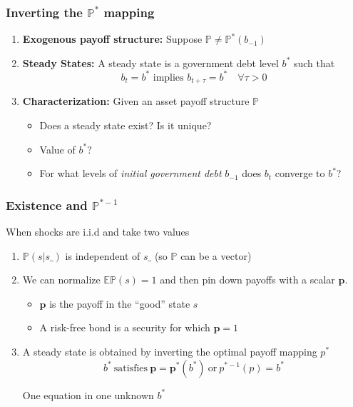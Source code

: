 \documentclass{beamer}
\begin{document}
%
\begin{frame}
	\frametitle{Inverting the $\mathbb{P}^*$ mapping}
	\begin{enumerate}
		\item  \textbf{Exogenous payoff structure:} Suppose $\mathbb{P}\neq \mathbb{P}^*(b_{-1})$
		
		\item \textbf{Steady States: } A steady state is a government debt level  $b^*$ such that
		\[b_{t}=b^* \text{ implies } b_{t+\tau}=b^*\quad \forall \tau >0\]
	
			
		\item \textbf{Characterization: } Given an asset payoff structure $\mathbb{P}$
		\begin{itemize}
			\item Does a steady state exist? Is it unique?
			\item Value of $b^*$?
			\item For what levels of  \emph{initial government debt} $b_{-1}$ does  $b_t$ converge to $b^*$?
 			\end{itemize}
	\end{enumerate}
\end{frame}



 \begin{frame}
  \frametitle{Existence and $\mathbb{P}^{* -1}$}


 When shocks are i.i.d and take two values

  \begin{enumerate}

\item $\mathbb{P}(s|s\_)$ is independent of $s\_$ (so $\mathbb{P}$ can be a vector)
\item We can normalize $\mathbb{E}\mathbb{P}(s)=1$ and  then pin down payoffs with a scalar $\bm{p}$.
\begin{itemize}
 \item $\bm{p}$ is the payoff in the ``good'' state $s$
 \item A risk-free bond is a security for which $\bm{p}=1$
\end{itemize}

\item A steady state is obtained by inverting the optimal payoff mapping $p^*$
\begin{equation*}
\label{eq-ss}
b^* \ \textrm{satisfies} \  \bm{p}=\bm{p}^*(b^*) \ \textrm{or} \ p^{* -1}(p) = b^*
\end{equation*}

One equation in one unknown $b^*$
\end{enumerate}
\end{frame}
\end{document}
